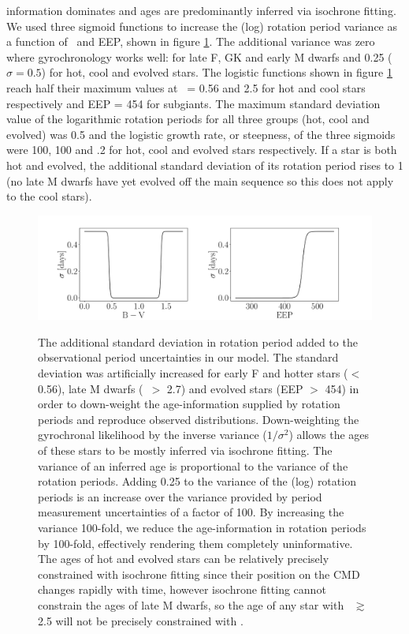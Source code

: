 information dominates and ages are predominantly inferred via isochrone
fitting.
We used three sigmoid functions to increase the (log) rotation period variance
as a function of \gcolor\ and EEP, shown in figure \ref{fig:variance}.
The additional variance was zero where gyrochronology works well: for late F,
GK and early M dwarfs and 0.25 ($\sigma = 0.5$) for hot, cool and evolved
stars.
The logistic functions shown in figure \ref{fig:variance} reach half their
maximum values at \gcolor\ = 0.56 and 2.5 for hot and cool stars respectively
and EEP = 454 for subgiants.
The maximum standard deviation value of the logarithmic rotation periods for
all three groups (hot, cool and evolved) was 0.5 and the logistic growth rate,
or steepness, of the three sigmoids were 100, 100 and .2 for hot, cool and
evolved stars respectively.
If a star is both hot and evolved, the additional standard deviation of its
rotation period rises to 1 (no late M dwarfs have yet evolved off the main
sequence so this does not apply to the cool stars).
\begin{figure}
  \caption{
    The additional standard deviation in rotation period added to the
    observational period uncertainties in our model.
    The standard deviation was artificially increased for early F and hotter
    stars (\gcolor $<$ 0.56), late M dwarfs (\gcolor\ $>$ 2.7) and evolved stars
    (EEP $>$ 454) in order to down-weight the age-information supplied by
    rotation periods and reproduce observed distributions.
    Down-weighting the gyrochronal likelihood by the inverse variance
    ($1/\sigma^2$) allows the ages of these stars to be mostly inferred
    via isochrone fitting.
    The variance of an inferred age is proportional to the
    variance of the rotation periods.
    Adding 0.25 to the variance of the (log) rotation periods is an increase over
    the variance provided by period measurement uncertainties of a factor of 100.
    By increasing the variance 100-fold, we reduce the age-information in
    rotation periods by 100-fold, effectively rendering them completely
    uninformative.
    The ages of hot and evolved stars can be relatively precisely constrained
    with isochrone fitting since their position on the CMD changes rapidly
    with time, however isochrone fitting cannot constrain the ages of
    late M dwarfs, so the age of any star with \gcolor\ $\gtrsim$ 2.5 will not
    be precisely constrained with \sd.
}
  \centering
    \includegraphics[width=1.\textwidth]{variance}
\label{fig:variance}
\end{figure}


